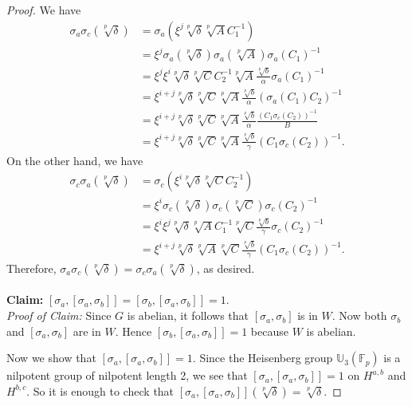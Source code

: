 \documentclass[12pt,leqno]{amsart}
\theoremstyle{plain}
\theoremstyle{definition}
\newcommand{\F}{{\mathbb F}}
\newcommand{\U}{{\mathbb U}}
\begin{document}
\begin{proof}
We have
\[
\begin{aligned}
\sigma_a\sigma_c(\sqrt[p]{\delta})&= \sigma_a(\xi^j \sqrt[p]{\delta} \sqrt[p]{A} C_1^{-1})\\
&= \xi^j \sigma_a(\sqrt[p]{\delta})\sigma_a(\sqrt[p]{A})\sigma_a(C_1)^{-1}\\
&= \xi^j \xi^i \sqrt[p]{\delta} \sqrt[p]{C} C_2^{-1} \sqrt[p]{A} \frac{\sqrt[p]{b}}{\alpha}\sigma_a(C_1)^{-1}\\
&=\xi^{i+j} \sqrt[p]{\delta} \sqrt[p]{C} \sqrt[p]{A} \frac{\sqrt[p]{b}}{\alpha} (\sigma_a(C_1)C_2)^{-1}\\
&= \xi^{i+j} \sqrt[p]{\delta} \sqrt[p]{C} \sqrt[p]{A} \frac{\sqrt[p]{b}}{\alpha} \frac{(C_1\sigma_c(C_2))^{-1}}{B}\\
&=\xi^{i+j} \sqrt[p]{\delta} \sqrt[p]{C} \sqrt[p]{A} \frac{\sqrt[p]{b}}{\gamma}(C_1\sigma_c(C_2))^{-1}.
\end{aligned}
\]
On the other hand, we have
\[
\begin{aligned}
\sigma_c\sigma_a(\sqrt[p]{\delta})&= \sigma_c(\xi^i \sqrt[p]{\delta} \sqrt[p]{C} C_2^{-1})\\
&= \xi^i \sigma_c(\sqrt[p]{\delta})\sigma_c(\sqrt[p]{C})\sigma_c(C_2)^{-1}\\
&= \xi^i \xi^j \sqrt[p]{\delta} \sqrt[p]{A} C_1^{-1} \sqrt[p]{C} \frac{\sqrt[p]{b}}{\gamma}\sigma_c(C_2)^{-1}\\
&=\xi^{i+j} \sqrt[p]{\delta} \sqrt[p]{A} \sqrt[p]{C} \frac{\sqrt[p]{b}}{\gamma} (C_1\sigma_c(C_2))^{-1}.
\end{aligned}
\]
Therefore, $\sigma_a\sigma_c(\sqrt[p]{\delta})=\sigma_c\sigma_a(\sqrt[p]{\delta})$, as desired. 
\\
\\
{\bf Claim:} $[\sigma_a,[\sigma_a,\sigma_b]]=[\sigma_b,[\sigma_a,\sigma_b]]=1$.\\
{\it Proof of Claim:} Since $G$ is abelian, it follows that $[\sigma_a,\sigma_b]$ is in $W$. Now both $\sigma_b$ and $[\sigma_a,\sigma_b]$ are in $W$. Hence $[\sigma_b,[\sigma_a,\sigma_b]]=1$ because $W$ is abelian.

Now we show that $[\sigma_a,[\sigma_a,\sigma_b]]=1$.
 Since the Heisenberg group $\U_3(\F_p)$ is a nilpotent group of nilpotent length 2, we see that $[\sigma_a,[\sigma_a,\sigma_b]]=1$ on $H^{a,b}$ and $H^{b,c}$. So it is enough to check that $[\sigma_a,[\sigma_a,\sigma_b]](\sqrt[p]{\delta})=\sqrt[p]{\delta}$.


\end{proof}
\end{document}
